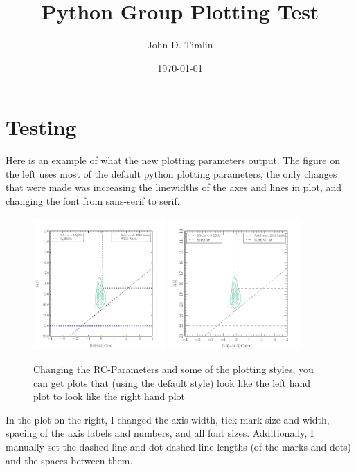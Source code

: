 \documentclass[onecolumn]{emulateapj}
\begin{document}
	

	\title{Python Group Plotting Test}
	
	\author{
		John D. Timlin}
	
	\date{\today}
	
	
	\clearpage
	
	\section{Testing}
	
	Here is an example of what the new plotting parameters output. The figure on the left uses most of the default python plotting parameters, the only changes that were made was increasing the linewidths of the axes and lines in plot, and changing the font from sans-serif to serif.
	

	
	\begin{figure}[!h]
		\centering
		\includegraphics[width=0.45\textwidth]{Group_Plotting.pdf}
		\includegraphics[width=0.45\textwidth]{Group_Plotting2.pdf}
		\caption{\footnotesize{Changing the RC-Parameters and some of the plotting styles, you can get plots that (using the default style) look like the left hand plot to look like the right hand plot}}
		\label{spies_detections}
	\end{figure}
	
		In the plot on the right, I changed the axis width, tick mark size and width, spacing of the axis labels and numbers, and all font sizes. Additionally, I manually set the dashed line and dot-dashed line lengths (of the marks and dots) and the spaces between them.
\end{document}

